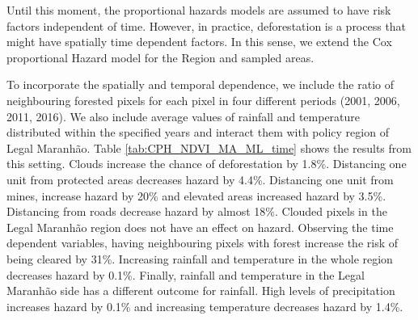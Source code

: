 
Until this moment, the proportional hazards models are assumed to have risk factors independent of time. However, in practice, deforestation is a process that might have spatially time dependent factors. In this sense, we extend the Cox proportional Hazard model for the Region and sampled areas. 

To incorporate the spatially and temporal dependence, we include the ratio of neighbouring forested pixels for each pixel in four different periods (2001, 2006, 2011, 2016). We also include average values of rainfall and temperature distributed within the specified years and interact them with policy region of Legal Maranhão. Table \ref{tab:CPH_NDVI_MA_ML_time} shows the results from this setting. Clouds increase the chance of deforestation by 1.8\%. Distancing one unit from protected areas decreases hazard by 4.4\%. Distancing one unit from mines, increase hazard by 20\% and elevated areas increased hazard by 3.5\%. Distancing from roads decrease hazard by almost 18\%. Clouded pixels in the Legal Maranhão region does not have an effect on hazard. Observing the time dependent variables, having neighbouring pixels with forest increase the risk of being cleared by 31\%. Increasing rainfall and temperature in the whole region decreases hazard by 0.1\%. Finally, rainfall and temperature in the Legal Maranhão side has a different outcome for rainfall. High levels of precipitation increases hazard by 0.1\% and increasing temperature decreases hazard by 1.4\%. 

